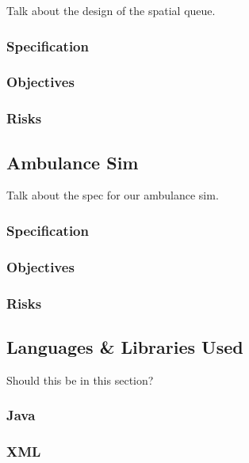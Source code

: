 \documentclass[a4paper]{article}
\begin{document}
Talk about the design of the spatial queue.

\subsubsection{Specification}

\subsubsection{Objectives}

\subsubsection{Risks}

\subsection{Ambulance Sim}%

Talk about the spec for our ambulance sim.

\subsubsection{Specification}

\subsubsection{Objectives}

\subsubsection{Risks}

\subsection{Languages & Libraries Used}%

Should this be in this section?

\subsubsection{Java}

\subsubsection{XML}
\end{document}
